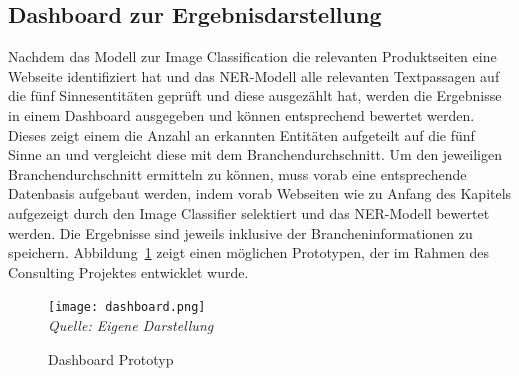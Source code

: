 \subsection{Dashboard zur Ergebnisdarstellung} \label{subsec_dashboard}
Nachdem das Modell zur Image Classification die relevanten Produktseiten eine Webseite identifiziert hat und das \ac{NER}-Modell
alle relevanten Textpassagen auf die fünf Sinnesentitäten geprüft und diese ausgezählt hat, werden die Ergebnisse
in einem Dashboard ausgegeben und können entsprechend bewertet werden.
Dieses zeigt einem die Anzahl an erkannten Entitäten aufgeteilt auf die fünf Sinne an und vergleicht diese mit dem
Branchendurchschnitt.
Um den jeweiligen Branchendurchschnitt ermitteln zu können, muss vorab eine entsprechende Datenbasis aufgebaut werden,
indem vorab Webseiten wie zu Anfang des Kapitels aufgezeigt durch den Image Classifier selektiert und das \ac{NER}-Modell
bewertet werden.
Die Ergebnisse sind jeweils inklusive der Brancheninformationen zu speichern.
Abbildung~\ref{fig:dashboard} zeigt einen möglichen Prototypen, der im Rahmen des Consulting Projektes entwicklet wurde.
\begin{figure}[H]
	\centering
	\caption[]{Dashboard Prototyp}
	\label{fig:dashboard}
	\texttt{[image: dashboard.png]}
	\\
	\textit{Quelle: Eigene Darstellung}
\end{figure}